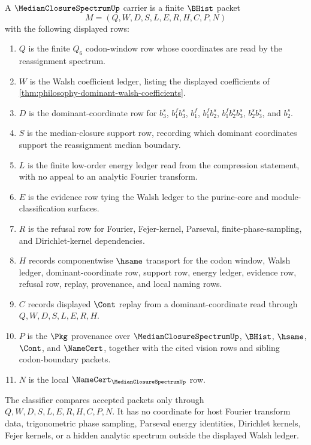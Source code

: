 \begin{definition}
\label{def:median-closure-spectrum-carrier}
A $\MedianClosureSpectrumUp$ carrier is a finite $\BHist$ packet
$$
M=(Q,W,D,S,L,E,R,H,C,P,N)
$$
with the following displayed rows:
\begin{enumerate}
\item $Q$ is the finite $Q_{6}$ codon-window row whose coordinates are read by the reassignment spectrum.
\item $W$ is the Walsh coefficient ledger, listing the displayed coefficients of \autoref{thm:philosophy-dominant-walsh-coefficients}.
\item $D$ is the dominant-coordinate row for $b_{3}^{s}$, $b_{1}^{f}b_{3}^{s}$, $b_{1}^{f}$, $b_{1}^{f}b_{2}^{s}$, $b_{1}^{f}b_{2}^{s}b_{3}^{s}$, $b_{2}^{s}b_{3}^{s}$, and $b_{2}^{s}$.
\item $S$ is the median-closure support row, recording which dominant coordinates support the reassignment median boundary.
\item $L$ is the finite low-order energy ledger read from the compression statement, with no appeal to an analytic Fourier transform.
\item $E$ is the evidence row tying the Walsh ledger to the purine-core and module-classification surfaces.
\item $R$ is the refusal row for Fourier, Fejer-kernel, Parseval, finite-phase-sampling, and Dirichlet-kernel dependencies.
\item $H$ records componentwise $\hsame$ transport for the codon window, Walsh ledger, dominant-coordinate row, support row, energy ledger, evidence row, refusal row, replay, provenance, and local naming rows.
\item $C$ records displayed $\Cont$ replay from a dominant-coordinate read through $Q,W,D,S,L,E,R,H$.
\item $P$ is the $\Pkg$ provenance over $\MedianClosureSpectrumUp$, $\BHist$, $\hsame$, $\Cont$, and $\NameCert$, together with the cited vision rows and sibling codon-boundary packets.
\item $N$ is the local $\NameCert_{\MedianClosureSpectrumUp}$ row.
\end{enumerate}
The classifier compares accepted packets only through $Q,W,D,S,L,E,R,H,C,P,N$. It has no coordinate for host Fourier transform data, trigonometric phase sampling, Parseval energy identities, Dirichlet kernels, Fejer kernels, or a hidden analytic spectrum outside the displayed Walsh ledger.
\end{definition}

